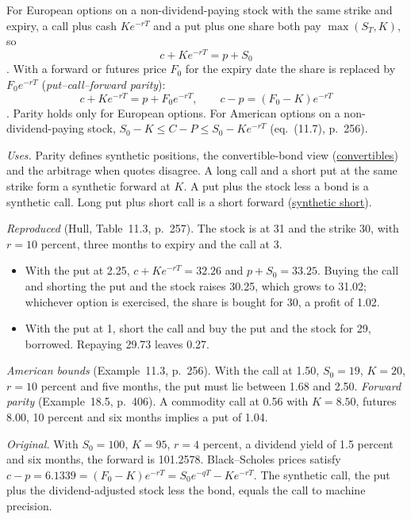 \begin{qfresult}\label{res:put-call-forward-parity}
 For European options on a non-dividend-paying stock with the same strike and expiry, a call plus cash $Ke^{-rT}$ and a put plus one share both pay $\max(S_T,K)$, so
\[ c+Ke^{-rT}=p+S_0 \]
\citep[chap.~11, sec.~11.4, eq.~(11.6), p.~256]{s7-hulloptions}. With a forward or futures price $F_0$ for the expiry date the share is replaced by $F_0e^{-rT}$ (\emph{put--call--forward parity}):
\[ c+Ke^{-rT}=p+F_0e^{-rT},\qquad c-p=(F_0-K)e^{-rT} \]
\citep[chap.~18, sec.~18.4, eq.~(18.1), p.~405]{s7-hulloptions}. Parity holds only for European options. For American options on a non-dividend-paying stock, $S_0-K\le C-P\le S_0-Ke^{-rT}$ (eq.~(11.7), p.~256).

\emph{Uses.} Parity defines synthetic positions, the convertible-bond view (\hyperref[meth:convertible-bond-valuation]{convertibles}) and the arbitrage when quotes disagree. A long call and a short put at the same strike form a synthetic forward at $K$. A put plus the stock less a bond is a synthetic call. Long put plus short call is a short forward (\hyperref[res:synthetic-short-put-call]{synthetic short}).

 \emph{Reproduced} (Hull, Table~11.3, p.~257). The stock is at 31 and the strike 30, with $r=10$ percent, three months to expiry and the call at 3.
\begin{itemize}
\item With the put at 2.25, $c+Ke^{-rT}=32.26$ and $p+S_0=33.25$. Buying the call and shorting the put and the stock raises 30.25, which grows to 31.02; whichever option is exercised, the share is bought for 30, a profit of 1.02.
\item With the put at 1, short the call and buy the put and the stock for 29, borrowed. Repaying 29.73 leaves 0.27.
\end{itemize}
\emph{American bounds} (Example~11.3, p.~256). With the call at 1.50, $S_0=19$, $K=20$, $r=10$ percent and five months, the put must lie between 1.68 and 2.50. \emph{Forward parity} (Example~18.5, p.~406). A commodity call at 0.56 with $K=8.50$, futures 8.00, 10 percent and six months implies a put of 1.04.

\emph{Original.} With $S_0=100$, $K=95$, $r=4$ percent, a dividend yield of 1.5 percent and six months, the forward is 101.2578. Black--Scholes prices satisfy $c-p=6.1339=(F_0-K)e^{-rT}=S_0e^{-qT}-Ke^{-rT}$. The synthetic call, the put plus the dividend-adjusted stock less the bond, equals the call to machine precision.


\end{qfresult}

